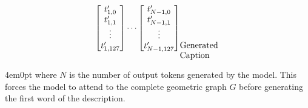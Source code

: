 {\begin{minipage}{\paperwidth}
\begin{equation*}
{					\quad \left[\begin{matrix}t'_{1,0} \\ t'_{1,1} \\ \vdots \\ t'_{1,127}\end{matrix}\right] 
					\cdots \left[\begin{matrix}t'_{N - 1,0} \\ t'_{N - 1,1} \\ \vdots \\ t'_{N - 1,127}\end{matrix}\right]}_{\parbox[c]{2cm}{Generated \\Caption}}
%				
				\end{equation*}
			\end{minipage}
		}
		\begin{indentedblock}{4em}{0pt}
			where $N$ is the number of output tokens generated by the model.
			This forces the model to attend to the complete geometric graph $G$ before generating the first word of the description.
		\end{indentedblock}
		
